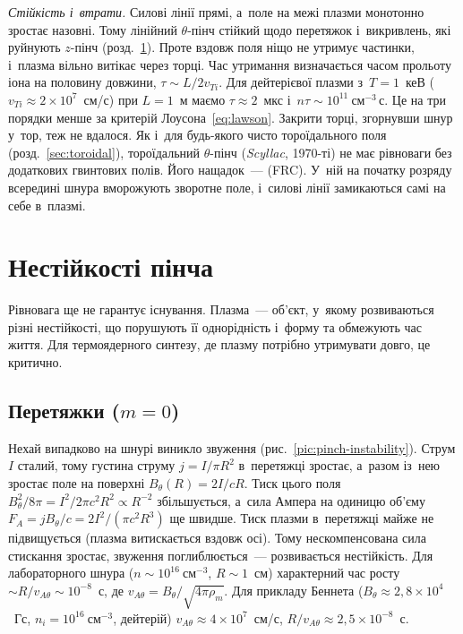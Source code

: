\emph{Стійкість і~втрати.} Силові лінії прямі, а~поле на межі плазми монотонно зростає
назовні. Тому лінійний $\theta$-пінч стійкий щодо перетяжок і~викривлень, які руйнують
$z$-пінч (розд.~\ref{sec:pinch-instabilities}). Проте вздовж поля ніщо не утримує частинки,
і~плазма вільно витікає через торці. Час утримання визначається часом прольоту іона на
половину довжини, $\tau\sim L/2v_{Ti}$. Для дейтерієвої плазми з~$T=1$~кеВ
($v_{Ti}\approx2\times10^7$~см/с) при $L=1$~м маємо $\tau\approx2$~мкс і~$n\tau\sim10^{11}~\mathrm{см}^{-3}\,\mathrm{с}$.
Це на три порядки менше за критерій Лоусона~\eqref{eq:lawson}. Закрити торці, згорнувши
шнур у~тор, теж не вдалося. Як і~для будь-якого чисто тороїдального поля
(розд.~\ref{sec:toroidal}), тороїдальний $\theta$-пінч (\emph{Scyllac}, 1970-ті) не має
рівноваги без додаткових гвинтових полів. Його нащадок~---  (FRC). У~ній на початку розряду всередині шнура вморожують зворотне поле, і~силові
лінії замикаються самі на себе в~плазмі.

\section{Нестійкості пінча}\label{sec:pinch-instabilities}

Рівновага ще не гарантує існування. Плазма~--- об'єкт, у~якому розвиваються різні
нестійкості, що порушують її однорідність і~форму та обмежують час життя. Для
термоядерного синтезу, де плазму потрібно утримувати довго, це критично.

\subsection*{Перетяжки (\texorpdfstring{$m=0$}{m = 0})}

Нехай випадково на шнурі виникло звуження (рис.~\ref{pic:pinch-instability}). Струм $I$
сталий, тому густина струму $j=I/\pi R^2$ в~перетяжці зростає, а~разом із~нею зростає поле
на поверхні $B_\theta(R)=2I/cR$. Тиск цього поля $B_\theta^2/8\pi=I^2/2\pi c^2R^2\propto
R^{-2}$ збільшується, а~сила Ампера на одиницю об'єму $F_A=jB_\theta/c=2I^2/(\pi c^2R^3)$
ще швидше. Тиск плазми в~перетяжці майже не підвищується (плазма витискається вздовж осі).
Тому нескомпенсована сила стискання зростає, звуження поглиблюється~--- розвивається
нестійкість. Для лабораторного шнура ($n\sim10^{16}~\mathrm{см}^{-3}$, $R\sim1$~см)
характерний час росту $\sim R/v_{A\theta}\sim10^{-8}$~с, де
$v_{A\theta}=B_\theta/\sqrt{4\pi\rho_m}$. Для прикладу Беннета ($B_\theta\approx2{,}8\times10^{4}$~Гс, $n_i=10^{16}~\mathrm{см}^{-3}$, дейтерій)
$v_{A\theta}\approx4\times10^{7}$~см/с, $R/v_{A\theta}\approx2{,}5\times10^{-8}$~с.

